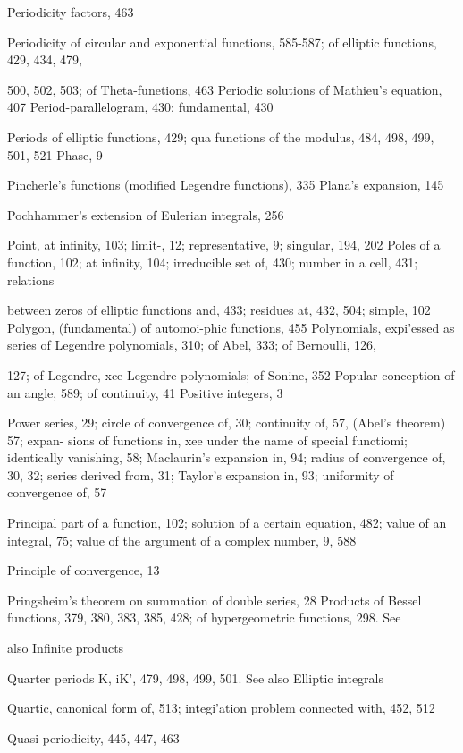 %
%
Periodicity factors, 463

Periodicity of circular and exponential functions, 585-587; of elliptic functions, 429, 434, 479,

500, 502, 503; of Theta-funetions, 463
Periodic solutions of Mathieu's equation, 407
Period-parallelogram, 430; fundamental, 430

Periods of elliptic functions, 429; qua functions of the modulus, 484, 498, 499, 501, 521 
Phase, 9

Pincherle's functions (modified Legendre functions), 335
Plana's expansion, 145

Pochhammer's extension of Eulerian integrals, 256

Point, at infinity, 103; limit-, 12; representative, 9; singular, 194, 202
Poles of a function, 102; at infinity, 104; irreducible set of, 430; number in a cell, 431; relations

between zeros of elliptic functions and, 433; residues at, 432, 504; simple, 102
Polygon, (fundamental) of automoi-phic functions, 455
Polynomials, expi'essed as series of Legendre polynomials, 310; of Abel, 333; of Bernoulli, 126,

127; of Legendre, xce Legendre polynomials; of Sonine, 352
Popular conception of an angle, 589; of continuity, 41
Positive integers, 3

Power series, 29; circle of convergence of, 30; continuity of, 57, (Abel's theorem) 57; expan-
sions of functions in, xee under the name  of special functiomi; identically vanishing, 58;
Maclaurin's expansion in, 94; radius of convergence of, 30, 32; series derived from, 31;
Taylor's expansion in, 93; uniformity of convergence of, 57

Principal part of a function, 102; solution of a certain equation,
482; value of an integral, 75;  value of the argument of a complex
number, 9, 588

Principle of convergence, 13

Pringsheim's theorem on summation of double series, 28
Products of Bessel functions, 379, 380, 383, 385, 428; of hypergeometric functions, 298. See

also Infinite products

Quarter periods K, iK', 479, 498, 499, 501. See also Elliptic integrals

Quartic, canonical form of, 513; integi'ation problem connected with, 452, 512

Quasi-periodicity, 445, 447, 463

